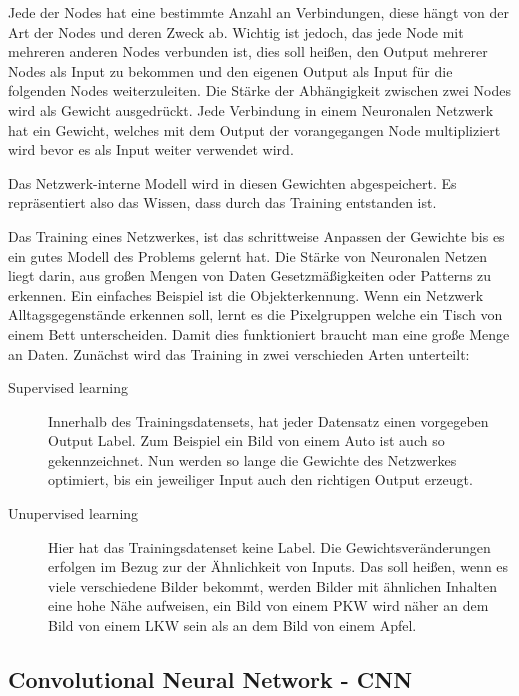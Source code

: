\documentclass[pdftex,a4paper,halfparskip, article]{scrartcl}
\begin{document}
Jede der Nodes hat eine bestimmte Anzahl an Verbindungen, diese hängt von der Art der Nodes und deren Zweck ab. Wichtig ist jedoch, das jede Node mit mehreren anderen Nodes verbunden ist, dies soll heißen, den Output mehrerer Nodes als Input zu bekommen und den eigenen Output als Input für die folgenden Nodes weiterzuleiten. Die Stärke der Abhängigkeit zwischen zwei Nodes wird als Gewicht ausgedrückt. Jede Verbindung in einem Neuronalen Netzwerk hat ein Gewicht, welches mit dem Output der vorangegangen Node multipliziert wird bevor es als Input weiter verwendet wird.

Das Netzwerk-interne Modell wird in diesen Gewichten abgespeichert. Es repräsentiert also das Wissen, dass durch das Training entstanden ist.

Das Training eines Netzwerkes, ist das schrittweise Anpassen der Gewichte bis es ein gutes Modell des Problems gelernt hat. Die Stärke von Neuronalen Netzen liegt darin, aus großen Mengen von Daten Gesetzmäßigkeiten oder Patterns zu erkennen. Ein einfaches Beispiel ist die Objekterkennung. Wenn ein Netzwerk Alltagsgegenstände erkennen soll, lernt es die Pixelgruppen welche ein Tisch von einem Bett unterscheiden. Damit dies funktioniert braucht man eine große Menge an Daten. Zunächst wird das Training in zwei verschieden Arten unterteilt: 

\begin{description}
	\item[Supervised learning] Innerhalb des Trainingsdatensets, hat jeder Datensatz einen vorgegeben Output Label. Zum Beispiel ein Bild von einem Auto ist auch so gekennzeichnet. Nun werden so lange die Gewichte des Netzwerkes optimiert, bis ein jeweiliger Input auch den richtigen Output erzeugt.
	\item[Unupervised learning] Hier hat das Trainingsdatenset keine Label. Die Gewichtsveränderungen erfolgen im Bezug zur der Ähnlichkeit von Inputs. Das soll heißen, wenn es viele verschiedene Bilder bekommt, werden Bilder mit ähnlichen Inhalten eine hohe Nähe aufweisen, ein Bild von einem PKW wird näher an dem Bild von einem LKW sein als an dem Bild von einem Apfel.
\end{description}

\subsection{Convolutional Neural Network - CNN}
\end{document}
